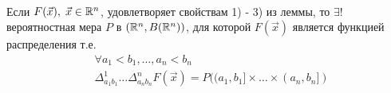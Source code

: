 \begin{theorem}~

	Если $F(\vec{x}),\; \vec{x} \in \mathbb{R}^n$, удовлетворяет свойствам 1) - 3) из леммы, то $\exists !$ вероятностная мера $P$ в $(\mathbb{R}^n, B(\mathbb{R}^n))$, для которой $F(\vec{x})$ является функцией распределения т.е. 
	\begin{align*}
		&\forall a_1 < b_1, \ldots, a_n < b_n\\
		&\Delta_{a_1 b_1}^1 \ldots \Delta_{a_n b_n}^n F(\vec{x}) = P((a_1, b_1] \times \ldots \times (a_n, b_n])
	\end{align*}
\end{theorem}
